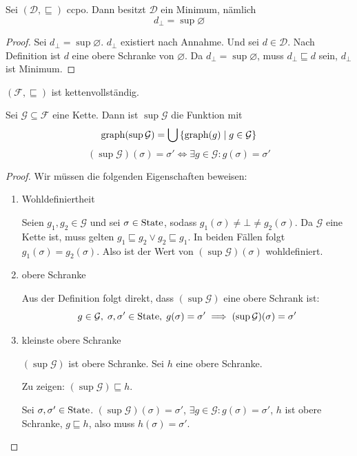 \par\bigskip
\begin{remark}[Fakt]
    Sei $(\mathcal{D}, \sqsubseteq)$ ccpo. Dann besitzt $\mathcal{D}$ ein Minimum, nämlich \[
            d_{\bot} = \sup \varnothing
        \]
\end{remark}

\begin{proof}
    Sei $d_{\bot} = \sup \varnothing$. $d_{\bot}$ existiert nach Annahme. Und sei $d \in \mathcal{D}$. Nach Definition ist $d$ eine obere Schranke von $\varnothing$. Da $d_{\bot} = \sup \varnothing$, muss $d_{\bot} \sqsubseteq d$ sein, \dh{} $d_{\bot}$ ist Minimum.
\end{proof}

\par\bigskip
\begin{theorem} \label{theorem:fkette}
    $(\mathcal{F}, \sqsubseteq)$ ist kettenvollständig.

    Sei $\mathcal{G} \subseteq \mathcal{F}$ eine Kette. Dann ist $\sup \mathcal{G}$ die Funktion mit \[
        \operatorname{graph}(\sup \mathcal{G}) = \bigcup \, \{ \operatorname{graph}(g) \mid g \in \mathcal{G} \}
    \]
    \dh{} \[
        (\sup \mathcal{G})(\sigma) = \sigma' \Leftrightarrow \exists g \in \mathcal{G}: g(\sigma) = \sigma'
    \]
\end{theorem}

\begin{proof}
    Wir müssen die folgenden Eigenschaften beweisen:
    \begin{enumerate}
        \item Wohldefiniertheit

            Seien $g_1, g_2 \in \mathcal{G}$ und sei $\sigma \in \operatorname{State}$, sodass $g_1(\sigma) \neq \bot \neq g_2(\sigma)$. Da $\mathcal{G}$ eine Kette ist, muss gelten $g_1 \sqsubseteq g_2 \vee g_2 \sqsubseteq g_1$. In beiden Fällen folgt $g_1(\sigma) = g_2(\sigma)$. Also ist der Wert von $(\sup \mathcal{G})(\sigma)$ wohldefiniert.
        \item obere Schranke

            Aus der Definition folgt direkt, dass $(\sup \mathcal{G})$ eine obere Schrank ist: \[
                g \in \mathcal{G}, \; \sigma, \sigma' \in \operatorname{State}, \; g(\sigma) = \sigma' \implies (\sup \mathcal{G})(\sigma) = \sigma'
            \]
        \item kleinste obere Schranke

            $(\sup \mathcal{G})$ ist obere Schranke. Sei $h$ eine obere Schranke.

            Zu zeigen: $(\sup \mathcal{G}) \sqsubseteq h$.

            Sei $\sigma, \sigma' \in \operatorname{State}$. $(\sup \mathcal{G})(\sigma) = \sigma'$, \dh{} $\exists g \in \mathcal{G}: g(\sigma) = \sigma'$, \dh{} $h$ ist obere Schranke, \dh{} $g \sqsubseteq h$, also muss $h(\sigma) = \sigma'$.
    \end{enumerate}
\end{proof}


